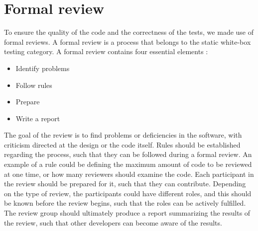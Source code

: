 \section{Formal review}
To ensure the quality of the code and the correctness of the tests, we made use of formal reviews.
A formal review is a process that belongs to the static white-box testing category.
A formal review contains four essential elements \cite{SoftwareTesting}:
\begin{itemize}\label{formalreview}
    \item Identify problems
    \item Follow rules
    \item Prepare
    \item Write a report
\end{itemize}
The goal of the review is to find problems or deficiencies in the software, with criticism directed at the design or the code itself.
Rules should be established regarding the process, such that they can be followed during a formal review.
An example of a rule could be defining the maximum amount of code to be reviewed at one time, or how many reviewers should examine the code.
Each participant in the review should be prepared for it, such that they can contribute.
Depending on the type of review, the participants could have different roles, and this should be known before the review begins, such that the roles can be actively fulfilled.
The review group should ultimately produce a report summarizing the results of the review, such that other developers can become aware of the results. 

